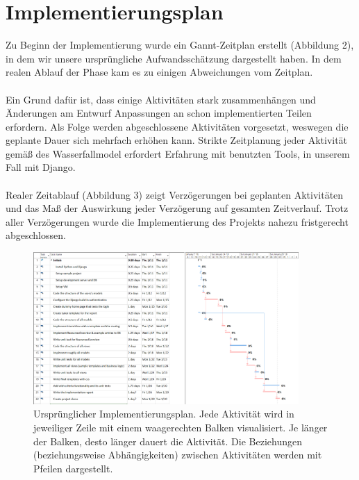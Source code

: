 \documentclass[parskip=full,11pt]{scrartcl}
\begin{document}
\section{Implementierungsplan}
Zu Beginn der Implementierung wurde ein Gannt-Zeitplan erstellt (Abbildung 2), in dem wir unsere ursprüngliche  Aufwandsschätzung dargestellt haben. In dem realen Ablauf der Phase kam es zu einigen Abweichungen vom Zeitplan.\\\\
Ein Grund dafür ist, dass einige Aktivitäten stark zusammenhängen und Änderungen am Entwurf Anpassungen an schon implementierten Teilen erfordern. Als Folge werden abgeschlossene Aktivitäten vorgesetzt, weswegen die geplante Dauer sich mehrfach erhöhen kann. Strikte Zeitplanung jeder Aktivität gemäß des Wasserfallmodel erfordert Erfahrung mit benutzten Tools, in unserem Fall mit Django. \\\\ 
Realer Zeitablauf (Abbildung 3) zeigt Verzögerungen bei geplanten Aktivitäten und das Maß der Auswirkung jeder Verzögerung auf gesamten Zeitverlauf. Trotz aller Verzögerungen wurde die Implementierung des Projekts nahezu fristgerecht abgeschlossen.\\


 \begin{figure}[ht!]
 	\centering
 	\includegraphics[width=0.9\textwidth]{res/gannt_plan.png}
 	\caption{Ursprünglicher Implementierungsplan. Jede Aktivität wird in jeweiliger Zeile mit einem waagerechten Balken visualisiert. Je länger der Balken, desto länger dauert die Aktivität. Die Beziehungen (beziehungsweise Abhängigkeiten) zwischen Aktivitäten werden mit Pfeilen dargestellt.}
 \end{figure}
 
\end{document}
